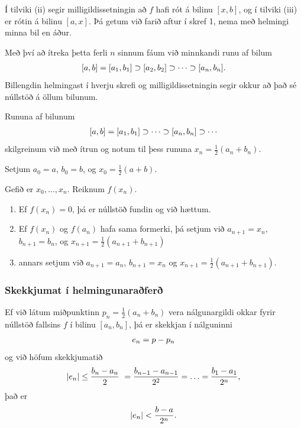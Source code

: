 \documentclass[a4paper,10pt,icelandic]{sphinxmanual}
\begin{document}
Í tilviki (ii) segir milligildissetningin að \(f\) hafi rót á bilinu
\([x,b]\), og í tilviki (iii) er rótin á bilinu \([a,x]\). Þá
getum við farið aftur í skref 1, nema með helmingi minna bil en áður.

Með því að ítreka þetta ferli \(n\) sinnum fáum við minnkandi runu
af bilum
\begin{gather}
\begin{split}[a,b]=[a_1,b_1]\supset [a_2,b_2]\supset \cdots\supset [a_n,b_n].\end{split}\notag
\end{gather}
Billengdin helmingast í hverju skrefi og milligildissetningin segir okkur að það sé núllstöð á öllum bilunum.

Rununa af bilunum
\begin{gather}
\begin{split}[a,b]= [a_1,b_1]\supset \cdots\supset [a_n,b_n]\supset \cdots\end{split}\notag
\end{gather}
skilgreinum við með ítrun og notum til þess rununa \(x_n=\frac 12(a_n+b_n)\).

Setjum \(a_0=a\), \(b_0=b\), og \(x_0=\frac 12(a+b)\).

Gefið er \(x_0,\dots,x_n\). Reiknum \(f(x_n)\).
\begin{enumerate}
\item {} 
Ef \(f(x_n) = 0\), þá er núllstöð fundin og við hættum.

\item {} 
Ef \(f(x_n)\) og \(f(a_n)\) hafa sama formerki, þá setjum við \(a_{n+1}=x_n\), \(b_{n+1}=b_n\), og  \(x_{n+1}=\frac 12(a_{n+1}+b_{n+1})\)

\item {} 
annars setjum við \(a_{n+1}=a_n\), \(b_{n+1}=x_n\) og \(x_{n+1}=\frac 12(a_{n+1}+b_{n+1})\).

\end{enumerate}


\subsubsection{Skekkjumat í helmingunaraðferð}
\label{kafli02:skekkjumat-i-helmingunarafer}
Ef við látum miðpunktinn \(p_n=\frac 12(a_n+b_n)\) vera
nálgunargildi okkar fyrir núllstöð fallsins \(f\) í bilinu
\([a_n,b_n]\), þá er skekkjan í nálguninni
\begin{gather}
\begin{split}e_n=p-p_n\end{split}\notag
\end{gather}
og við höfum skekkjumatið
\begin{gather}
\begin{split}|e_n|\leq  \dfrac{b_n - a_n}{2}\
= \frac{b_{n-1}-a_{n-1}}{2^2} = \ldots = \dfrac{b_1-a_1}{2^{n}},\end{split}\notag
\end{gather}
það er
\begin{gather}
\begin{split}|e_n| < \dfrac{b-a}{2^{n}}.\end{split}\notag
\end{gather}
\end{document}
